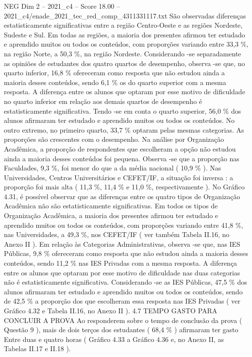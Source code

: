 \begin{textsample}{NEG Dim 2 – 2021\_c4 – Score 18.00 – 2021\_c4/enade\_2021\_tec\_red\_comp\_4311331117.txt}
São observadas diferenças estatisticamente significativas entre a região Centro-Oeste e as regiões Nordeste, Sudeste e Sul.
Em todas as regiões, a maioria dos presentes afirmou ter estudado e aprendido muitos ou todos os conteúdos, com proporções variando entre 33,3 \%, na região Norte, a 50,3 \%, na região Nordeste.
Considerando -se separadamente as opiniões de estudantes dos quatro quartos de desempenho, observa -se que, no quarto inferior, 16,8 \% ofereceram como resposta que não estudou ainda a maioria desses conteúdos, sendo 6,1 \% os do quarto superior com a mesma resposta.
A diferença entre os alunos que optaram por esse motivo de dificuldade no quarto inferior em relação aos demais quartos de desempenho é estatisticamente significativa.
Tendo -se em conta o quarto superior, 56,0 \% dos alunos afirmaram ter estudado e aprendido muitos ou todos os conteúdos.
No outro extremo, no primeiro quarto, 33,7 \% optaram pelas mesmas categorias.
As proporções são crescentes com o desempenho.
Na análise por Organização Acadêmica, a proporção de respondentes que escolheram a opção não estudou ainda a maioria desses conteúdos foi pequena.
Observa -se que a proporção nas Faculdades, 9,3 \%, foi menor do que a da média nacional ( 10,9 \% ).
Nas Universidades, Centros Universitários e CEFET/IF, a situação foi inversa : a proporção foi mais alta ( 11,3 \%, 11,4 \% e 11,0 \%, respectivamente ).
No Gráfico 4.31, é possível observar que as diferenças entre os quatro tipos de Organização Acadêmica não são estatisticamente significativas.
Em todos os tipos de Organização Acadêmica, a maioria dos presentes afirmou ter estudado e aprendido muitos ou todos os conteúdos, com proporções variando entre 41,8 \%, nas Universidades, a 49,3 \%, nos CEFET/IF ( ver também Tabela II.16, no Anexo II ).
Em relação às Categorias Administrativas, observa -se que, nas IES Públicas, 9,8 \% ofereceram como resposta que não estudou ainda a maioria desses conteúdos, sendo 11,2 \% nas IES Privadas com a mesma resposta.
A diferença entre os alunos que optaram por esse motivo de dificuldade nas duas categorias não é estatisticamente significativa.
Considerando -se as IES Públicas, 47,5 \% dos alunos afirmaram ter estudado e aprendido muitos ou todos os conteúdos, sendo de 42,5 \% a proporção dos que escolheram essa resposta nas IES Privadas ( ver Gráfico 4.32 e Tabela II.16, no Anexo II ). 4.7 TEMPO GASTO PARA CONCLUIR A PROVA Ao responderem sobre o tempo de conclusão da prova ( Questão 9 ), mais de dois terços dos estudantes ( 68,4 \% ) afirmaram ter gasto Entre duas e quatro horas ( Gráfico 4.33 a Gráfico 4.36 e, no Anexo II, as Tabelas II.17 e II.18 ).

\end{textsample}
